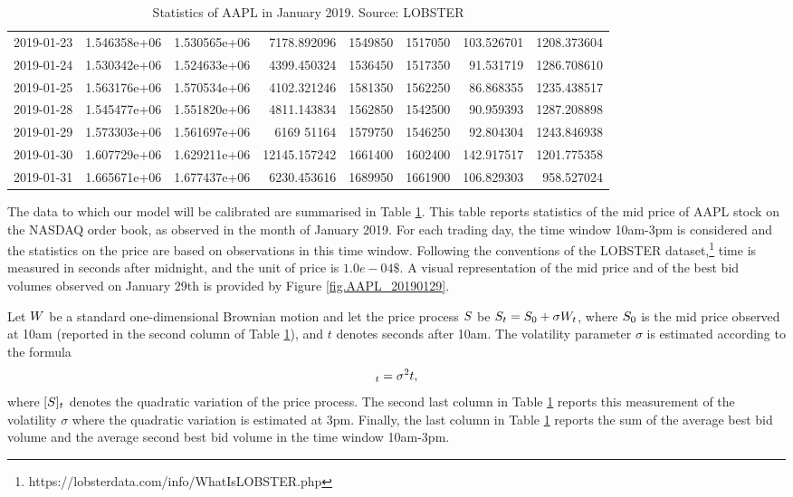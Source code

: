 \documentclass[10pt,a4paper]{article}
\begin{document}
\begin{table}
\begin{tiny}
{\begin{tabular}{lrrrrrrr}
			2019-01-23 &   1.546358e+06 &  1.530565e+06 &   7178.892096 &  1549850   &  1517050   &     103.526701 &  1208.373604 \\
			2019-01-24 &   1.530342e+06 &  1.524633e+06 &   4399.450324 &  1536450   &  1517350   &    91.531719 &  1286.708610 \\
			2019-01-25 &   1.563176e+06 &  1.570534e+06 &   4102.321246 &  1581350   &  1562250   &      86.868355 &  1235.438517 \\
			2019-01-28 &   1.545477e+06 &  1.551820e+06 &   4811.143834 &  1562850   &  1542500   &      90.959393 &  1287.208898 \\
			2019-01-29 &   1.573303e+06 &  1.561697e+06 &   6169  51164 &  1579750   &  1546250   &      92.804304 &  1243.846938 \\
			2019-01-30 &   1.607729e+06 &  1.629211e+06 &  12145.157242 &  1661400   &  1602400   &     142.917517 &  1201.775358 \\
			2019-01-31 &    1.665671e+06 &  1.677437e+06 &   6230.453616 &  1689950 &  1661900 &             106.829303 &   958.527024
			\\
		\end{tabular}
	}
\end{tiny}
\caption{{Statistics of AAPL in January 2019. Source: LOBSTER}}
\label{tab.statAAPLjanuary2019}
\end{table}

The data to which our model will be calibrated are summarised in Table \ref{tab.statAAPLjanuary2019}. This table reports statistics of the mid price of AAPL stock on the NASDAQ order book, as observed in the month of January 2019. For each trading day, the time window 10am-3pm is considered and the statistics on the price are based on observations in this time window. Following the conventions of the LOBSTER dataset,\footnote{https://lobsterdata.com/info/WhatIsLOBSTER.php} time is measured in seconds after midnight, and the unit of price is $1.0e-04\$$. A visual representation of the mid price and of the best bid volumes observed on January 29th is provided by Figure \ref{fig.AAPL_20190129}.

Let $W$ be a standard one-dimensional Brownian motion and let the price process $S$ be $S_t = S_0 + \sigma W_t$, where $S_0$ is the mid price observed at 10am (reported in the second column of Table \ref{tab.statAAPLjanuary2019}), and $t$ denotes seconds after 10am. The volatility parameter $\sigma$ is estimated according to the formula 
\begin{equation*}
[\fundamentalPrice]_t = \sigma\squared t,
\end{equation*}
where $[S]_t$ denotes the quadratic variation of the price process. The second last column in Table \ref{tab.statAAPLjanuary2019} reports this measurement of the volatility $\sigma$ where the quadratic variation is estimated at 3pm. Finally, the last column in Table \ref{tab.statAAPLjanuary2019} reports the sum of the average best bid volume and the average second best bid volume in the time window 10am-3pm.  
\end{document}
